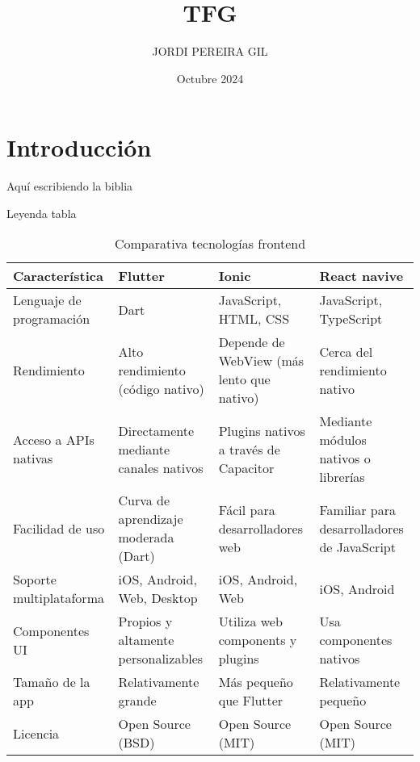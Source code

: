 \documentclass{article}
\title{TFG}
\author{JORDI PEREIRA GIL}
\date{Octubre 2024}
\begin{document}
\maketitle

\section{Introducción}
Aquí escribiendo la biblia

\begin{table}
    \centering
    \caption{Leyenda tabla}
\scriptsize
\begin{tabular}{|p{3cm}|p{3cm}|p{3cm}|p{3cm}|} \hline 
         \textbf{Característica}&  \textbf{Flutter}&  \textbf{Ionic}& \textbf{React navive}\\ \hline 
         Lenguaje de programación&  Dart&  JavaScript, HTML, CSS& JavaScript, TypeScript\\ \hline 
         Rendimiento&  Alto rendimiento (código nativo)&  Depende de WebView (más lento que nativo)& Cerca del rendimiento nativo\\ \hline 
         Acceso a APIs nativas&  Directamente mediante canales nativos&  Plugins nativos a través de Capacitor& Mediante módulos nativos o librerías\\ \hline 
         Facilidad de uso&  Curva de aprendizaje moderada (Dart)&  Fácil para desarrolladores web& Familiar para desarrolladores de JavaScript\\ \hline 
         Soporte multiplataforma&  iOS, Android, Web, Desktop&  iOS, Android, Web& iOS, Android\\ \hline 
         Componentes UI&  Propios y altamente personalizables&  Utiliza web components y plugins& Usa componentes nativos\\ \hline 
         Tamaño de la app&  Relativamente grande&  Más pequeño que Flutter& Relativamente pequeño\\ \hline 
         Licencia&  Open Source (BSD)&  Open Source (MIT)& Open Source (MIT)\\ \hline
    \end{tabular}
\caption{Comparativa tecnologías frontend}
\label{tab:my_table}
    
    
\end{table}





\end{document}
